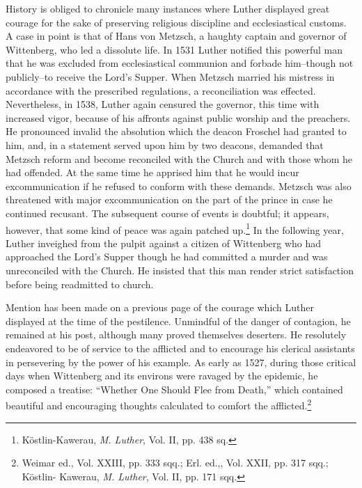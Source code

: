 History is obliged to chronicle many instances where Luther displayed
great courage for the sake of preserving religious discipline
and ecclesiastical customs. A case in point is that of Hans von Metzsch,
a haughty captain and governor of Wittenberg, who led a dissolute
life. In 1531 Luther notified this powerful man that he was excluded
from ecclesiastical communion and forbade him--though not publicly--to
receive the Lord’s Supper. When Metzsch married his
mistress in accordance with the prescribed regulations, a reconciliation
was effected. Nevertheless, in 1538, Luther again censured the
governor, this time with increased vigor, because of his affronts
against public worship and the preachers. He pronounced invalid the
absolution which the deacon Froschel had granted to him, and, in a
statement served upon him by two deacons, demanded that Metzsch
reform and become reconciled with the Church and with those whom
he had offended. At the same time he apprised him that he would
incur excommunication if he refused to conform with these demands.
Metzsch was also threatened with major excommunication on the part
of the prince in case he continued recusant. The subsequent course of
events is doubtful; it appears, however, that some kind of peace was
again patched up.\footnote{Köstlin-Kawerau, \textit{M. Luther}, Vol. II, pp. 438 sq.}
In the following year, Luther inveighed from
the pulpit against a citizen of Wittenberg who had approached the
Lord’s Supper though he had committed a murder and was unreconciled
with the Church. He insisted that this man render strict satisfaction
before being readmitted to church.

Mention has been made on a previous page of the courage which
Luther displayed at the time of the pestilence. Unmindful of the
danger of contagion, he remained at his post, although many proved
themselves deserters. He resolutely endeavored to be of service to the
afflicted and to encourage his clerical assistants in persevering by the
power of his example. As early as 1527, during those critical days
when Wittenberg and its environs were ravaged by the epidemic, he
composed a treatise: “Whether One Should Flee from Death,” which
contained beautiful and encouraging thoughts calculated to comfort
the afflicted.\footnote
{Weimar ed., Vol. XXIII, pp. 333 sqq.; Erl. ed.,, Vol. XXII, pp. 317 sqq.; Köstlin-
Kawerau, \textit{M. Luther}, Vol. II, pp. 171 sqq.}

